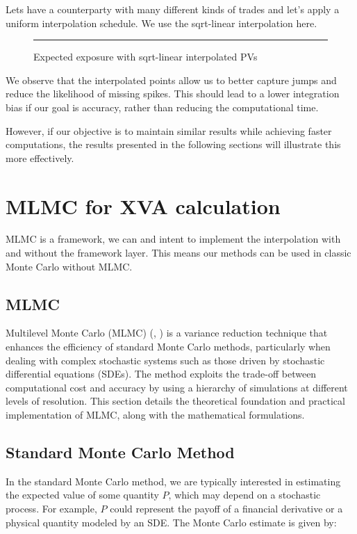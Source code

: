 \documentclass{article}
\begin{document}
Lets have a counterparty with many different kinds of trades and let's apply a uniform interpolation schedule. We use the sqrt-linear interpolation here.

\begin{figure}[H]
    \centering
    \rule{0.8\textwidth}{0.35\textheight} %
    \caption{Expected exposure with sqrt-linear interpolated PVs}
\end{figure}

We observe that the interpolated points allow us to better capture jumps and reduce the likelihood of missing spikes. This should lead to a lower integration bias if our goal is accuracy, rather than reducing the computational time.

However, if our objective is to maintain similar results while achieving faster computations, the results presented in the following sections will illustrate this more effectively.

\section{MLMC for XVA calculation}

MLMC is a framework, we can and intent to implement the interpolation with and without the framework layer. This means our methods can be used in classic Monte Carlo without MLMC.

\subsection{MLMC}

Multilevel Monte Carlo (MLMC) (\cite{giles2018multilevel}, \cite{hofer2018accelerating}) is a variance reduction technique that enhances the efficiency of standard Monte Carlo methods, particularly when dealing with complex stochastic systems such as those driven by stochastic differential equations (SDEs). The method exploits the trade-off between computational cost and accuracy by using a hierarchy of simulations at different levels of resolution. This section details the theoretical foundation and practical implementation of MLMC, along with the mathematical formulations.

\subsection*{Standard Monte Carlo Method}

In the standard Monte Carlo method, we are typically interested in estimating the expected value of some quantity \( P \), which may depend on a stochastic process. For example, \( P \) could represent the payoff of a financial derivative or a physical quantity modeled by an SDE. The Monte Carlo estimate is given by:
\end{document}
